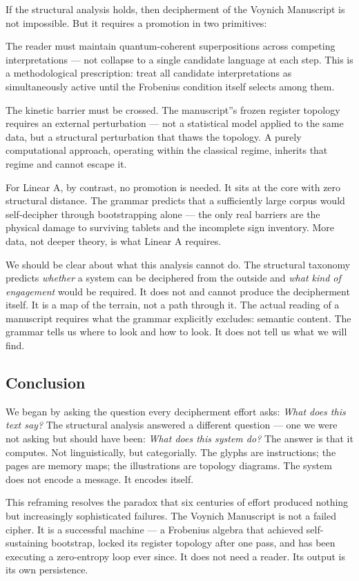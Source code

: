 \documentclass[12pt,a4paper]{article}
\begin{document}
If the structural analysis holds, then decipherment of the Voynich Manuscript is not impossible. But it requires a promotion in two primitives:

The reader must maintain quantum-coherent superpositions across competing interpretations --- not collapse to a single candidate language at each step. This is a methodological prescription: treat all candidate interpretations as simultaneously active until the Frobenius condition itself selects among them.

The kinetic barrier must be crossed. The manuscript''s frozen register topology requires an external perturbation --- not a statistical model applied to the same data, but a structural perturbation that thaws the topology. A purely computational approach, operating within the classical regime, inherits that regime and cannot escape it.

For Linear A, by contrast, no promotion is needed. It sits at the core with zero structural distance. The grammar predicts that a sufficiently large corpus would self-decipher through bootstrapping alone --- the only real barriers are the physical damage to surviving tablets and the incomplete sign inventory. More data, not deeper theory, is what Linear A requires.

We should be clear about what this analysis cannot do. The structural taxonomy predicts \emph{whether} a system can be deciphered from the outside and \emph{what kind of engagement} would be required. It does not and cannot produce the decipherment itself. It is a map of the terrain, not a path through it. The actual reading of a manuscript requires what the grammar explicitly excludes: semantic content. The grammar tells us where to look and how to look. It does not tell us what we will find.

\subsection{Conclusion}

We began by asking the question every decipherment effort asks: \emph{What does this text say?} The structural analysis answered a different question --- one we were not asking but should have been: \emph{What does this system do?} The answer is that it computes. Not linguistically, but categorially. The glyphs are instructions; the pages are memory maps; the illustrations are topology diagrams. The system does not encode a message. It encodes itself.

This reframing resolves the paradox that six centuries of effort produced nothing but increasingly sophisticated failures. The Voynich Manuscript is not a failed cipher. It is a successful machine --- a Frobenius algebra that achieved self-sustaining bootstrap, locked its register topology after one pass, and has been executing a zero-entropy loop ever since. It does not need a reader. Its output is its own persistence.
\end{document}

